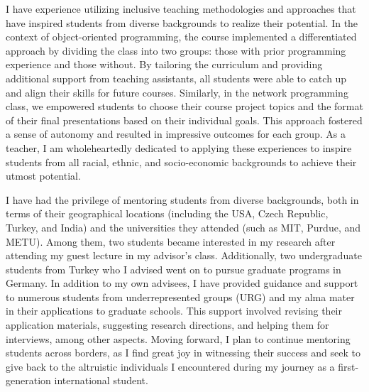 \documentclass[10pt]{article}
\renewcommand*\paragraph[1]{}
\begin{document}
I have experience utilizing inclusive teaching methodologies and approaches that have inspired students from diverse backgrounds to realize their potential. In the context of object-oriented programming, the course implemented a differentiated approach by dividing the class into two groups: those with prior programming experience and those without. By tailoring the curriculum and providing additional support from teaching assistants, all students were able to catch up and align their skills for future courses. Similarly, in the network programming class, we empowered students to choose their course project topics and the format of their final presentations based on their individual goals. This approach fostered a sense of autonomy and resulted in impressive outcomes for each group. As a teacher, I am wholeheartedly dedicated to applying these experiences to inspire students from all racial, ethnic, and socio-economic backgrounds to achieve their utmost potential.

I have had the privilege of mentoring students from diverse backgrounds, both in terms of their geographical locations (including the USA, Czech Republic, Turkey, and India) and the universities they attended (such as MIT, Purdue, and METU). Among them, two students became interested in my research after attending my guest lecture in my advisor's class. Additionally, two undergraduate students from Turkey who I advised went on to pursue graduate programs in Germany. In addition to my own advisees, I have provided guidance and support to numerous students from underrepresented groups (URG) and my alma mater in their applications to graduate schools. This support involved revising their application materials, suggesting research directions, and helping them for interviews, among other aspects. Moving forward, I plan to continue mentoring students across borders, as I find great joy in witnessing their success and seek to give back to the altruistic individuals I encountered during my journey as a first-generation international student.
\end{document}

